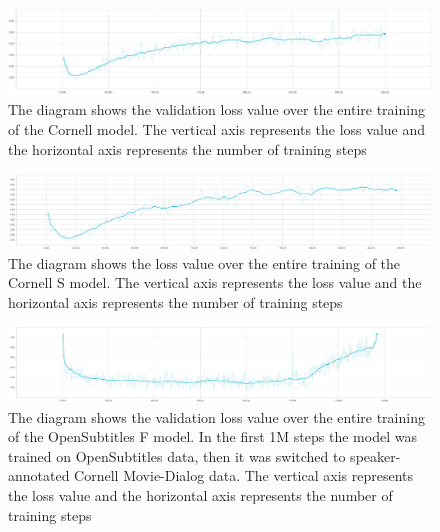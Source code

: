 \documentclass[12pt]{article}
\begin{document}
\begin{figure}[H] 
	\centering
	\includegraphics[width=1.0\textwidth]{pics/cornell_loss.png}
	\caption{The diagram shows the validation loss value over the entire training of the Cornell model. The vertical axis represents the loss value and the horizontal axis represents the number of training steps}
	\label{CornellOverfit}
\end{figure}
\begin{figure}[H] 
	\centering
	\includegraphics[width=1.0\textwidth]{pics/cornell_speakers_loss.png}
	\caption{The diagram shows the loss value over the entire training of the Cornell S model. The vertical axis represents the loss value and the horizontal axis represents the number of training steps}
	\label{CornellSOverfit}
\end{figure}
\begin{figure}[H] 
	\centering
	\includegraphics[width=1.0\textwidth]{pics/finetuned_loss.png}
	\caption{The diagram shows the validation loss value over the entire training of the OpenSubtitles F model. In the first 1M steps the model was trained on OpenSubtitles data, then it was switched to speaker-annotated Cornell Movie-Dialog data. The vertical axis represents the loss value and the horizontal axis represents the number of training steps}
	\label{Finetuned_loss}
\end{figure}
\end{document}
